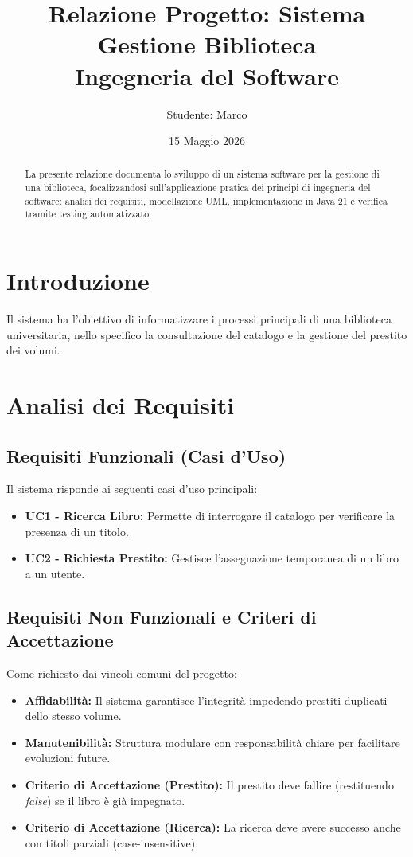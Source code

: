 \documentclass[12pt, a4paper]{article}
\title{Relazione Progetto: Sistema Gestione Biblioteca \\ \large Ingegneria del Software}
\author{Studente: Marco}
\date{15 Maggio 2026}
\begin{document}
\maketitle

\begin{abstract}
La presente relazione documenta lo sviluppo di un sistema software per la gestione di una biblioteca, focalizzandosi sull'applicazione pratica dei principi di ingegneria del software: analisi dei requisiti, modellazione UML, implementazione in Java 21 e verifica tramite testing automatizzato.
\end{abstract}

\tableofcontents
\newpage

\section{Introduzione}
Il sistema ha l'obiettivo di informatizzare i processi principali di una biblioteca universitaria, nello specifico la consultazione del catalogo e la gestione del prestito dei volumi.

\section{Analisi dei Requisiti}
\subsection{Requisiti Funzionali (Casi d'Uso)}
Il sistema risponde ai seguenti casi d'uso principali:
\begin{itemize}
    \item \textbf{UC1 - Ricerca Libro:} Permette di interrogare il catalogo per verificare la presenza di un titolo.
    \item \textbf{UC2 - Richiesta Prestito:} Gestisce l'assegnazione temporanea di un libro a un utente.
\end{itemize}

\subsection{Requisiti Non Funzionali e Criteri di Accettazione}
Come richiesto dai vincoli comuni del progetto:
\begin{itemize}
    \item \textbf{Affidabilità:} Il sistema garantisce l'integrità impedendo prestiti duplicati dello stesso volume.
    \item \textbf{Manutenibilità:} Struttura modulare con responsabilità chiare per facilitare evoluzioni future.
    \item \textbf{Criterio di Accettazione (Prestito):} Il prestito deve fallire (restituendo \textit{false}) se il libro è già impegnato.
    \item \textbf{Criterio di Accettazione (Ricerca):} La ricerca deve avere successo anche con titoli parziali (case-insensitive).
\end{itemize}
\end{document}
